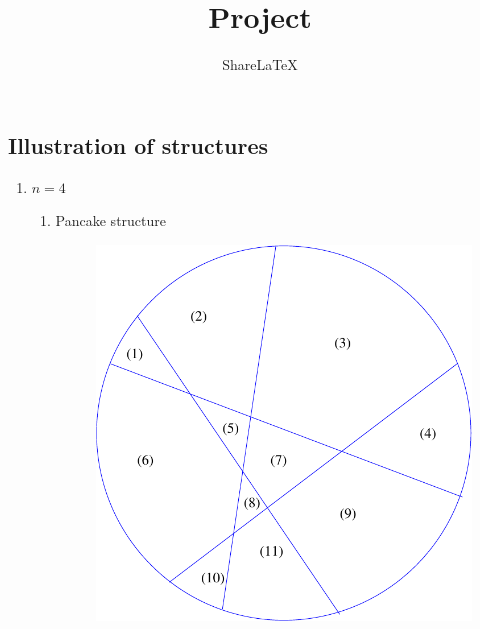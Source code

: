\documentclass[a4paper,10pt]{article}
\title{Project}
\author{Share\LaTeX}
\begin{document}
\maketitle

\subsection{Illustration of structures }
\begin{enumerate}
  \item $n = 4$\\


  	\begin{enumerate}
    	\item Pancake structure\\
    	\begin{figure}[h!]
			\includegraphics[scale=0.3]{graphics/pancakecut11}
			\captionsetup{labelformat=empty}
			\caption{}
			\label{fig:pancakecut11}
		\end{figure}
   

\end{enumerate}
\end{enumerate}
\end{document}
